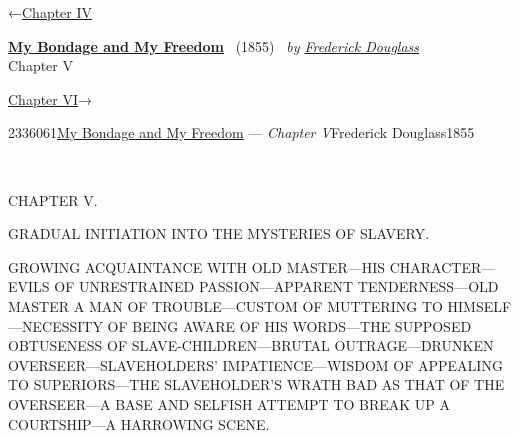 \hypertarget{headerContainer}{}
\hypertarget{navigationHeader}{}
\protect\hypertarget{headerprevious}{}{←\href{/wiki/My_Bondage_and_My_Freedom_(1855)/Chapter_IV}{Chapter
IV}}

\textbf{\protect\hypertarget{header_title_text}{}{\href{/wiki/My_Bondage_and_My_Freedom_(1855)}{My
Bondage and My Freedom}}} ~(1855)~ \emph{by
\href{/wiki/Author:Frederick_Douglass}{\protect\hypertarget{header_author_text}{}{{Frederick
Douglass}}}}\\
\protect\hypertarget{header_section_text}{}{Chapter V}

\protect\hypertarget{headernext}{}{\href{/wiki/My_Bondage_and_My_Freedom_(1855)/Chapter_VI}{Chapter
VI}→}

\hypertarget{navigationNotes}{}

\hypertarget{ws-data}{}
\protect\hypertarget{ws-article-id}{}{2336061}\protect\hypertarget{ws-title}{}{\href{/wiki/My_Bondage_and_My_Freedom_(1855)}{My
Bondage and My Freedom} --- \emph{Chapter
V}}\protect\hypertarget{ws-author}{}{Frederick
Douglass}\protect\hypertarget{ws-year}{}{1855}

{\protect\hypertarget{79}{}{}}

~

{CHAPTER V.}

GRADUAL INITIATION INTO THE MYSTERIES OF SLAVERY.

{GROWING ACQUAINTANCE WITH OLD MASTER---HIS CHARACTER---EVILS OF
UNRESTRAINED PASSION---APPARENT TENDERNESS---OLD MASTER A MAN OF
TROUBLE---CUSTOM OF MUTTERING TO HIMSELF---NECESSITY OF BEING AWARE OF
HIS WORDS---THE SUPPOSED OBTUSENESS OF SLAVE-CHILDREN---BRUTAL
OUTRAGE---DRUNKEN OVERSEER---SLAVEHOLDERS' IMPATIENCE---WISDOM OF
APPEALING TO SUPERIORS---THE SLAVEHOLDER'S WRATH BAD AS THAT OF THE
OVERSEER---A BASE AND SELFISH ATTEMPT TO BREAK UP A COURTSHIP---A
HARROWING SCENE.}

